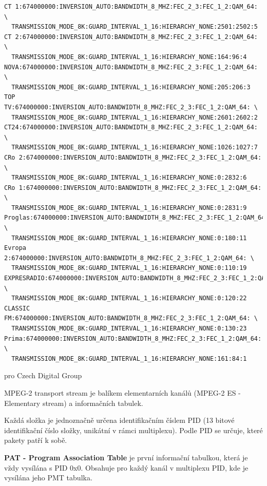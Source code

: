 \begin{small}
\begin{verbatim}
CT 1:674000000:INVERSION_AUTO:BANDWIDTH_8_MHZ:FEC_2_3:FEC_1_2:QAM_64: \
  TRANSMISSION_MODE_8K:GUARD_INTERVAL_1_16:HIERARCHY_NONE:2501:2502:5
CT 2:674000000:INVERSION_AUTO:BANDWIDTH_8_MHZ:FEC_2_3:FEC_1_2:QAM_64: \
  TRANSMISSION_MODE_8K:GUARD_INTERVAL_1_16:HIERARCHY_NONE:164:96:4
NOVA:674000000:INVERSION_AUTO:BANDWIDTH_8_MHZ:FEC_2_3:FEC_1_2:QAM_64: \
  TRANSMISSION_MODE_8K:GUARD_INTERVAL_1_16:HIERARCHY_NONE:205:206:3
TOP TV:674000000:INVERSION_AUTO:BANDWIDTH_8_MHZ:FEC_2_3:FEC_1_2:QAM_64: \
  TRANSMISSION_MODE_8K:GUARD_INTERVAL_1_16:HIERARCHY_NONE:2601:2602:2
CT24:674000000:INVERSION_AUTO:BANDWIDTH_8_MHZ:FEC_2_3:FEC_1_2:QAM_64: \
  TRANSMISSION_MODE_8K:GUARD_INTERVAL_1_16:HIERARCHY_NONE:1026:1027:7
CRo 2:674000000:INVERSION_AUTO:BANDWIDTH_8_MHZ:FEC_2_3:FEC_1_2:QAM_64: \
  TRANSMISSION_MODE_8K:GUARD_INTERVAL_1_16:HIERARCHY_NONE:0:2832:6
CRo 1:674000000:INVERSION_AUTO:BANDWIDTH_8_MHZ:FEC_2_3:FEC_1_2:QAM_64: \
  TRANSMISSION_MODE_8K:GUARD_INTERVAL_1_16:HIERARCHY_NONE:0:2831:9
Proglas:674000000:INVERSION_AUTO:BANDWIDTH_8_MHZ:FEC_2_3:FEC_1_2:QAM_64: \
  TRANSMISSION_MODE_8K:GUARD_INTERVAL_1_16:HIERARCHY_NONE:0:180:11
Evropa 2:674000000:INVERSION_AUTO:BANDWIDTH_8_MHZ:FEC_2_3:FEC_1_2:QAM_64: \
  TRANSMISSION_MODE_8K:GUARD_INTERVAL_1_16:HIERARCHY_NONE:0:110:19
EXPRESRADIO:674000000:INVERSION_AUTO:BANDWIDTH_8_MHZ:FEC_2_3:FEC_1_2:QAM_64: \
  TRANSMISSION_MODE_8K:GUARD_INTERVAL_1_16:HIERARCHY_NONE:0:120:22
CLASSIC FM:674000000:INVERSION_AUTO:BANDWIDTH_8_MHZ:FEC_2_3:FEC_1_2:QAM_64: \
  TRANSMISSION_MODE_8K:GUARD_INTERVAL_1_16:HIERARCHY_NONE:0:130:23
Prima:674000000:INVERSION_AUTO:BANDWIDTH_8_MHZ:FEC_2_3:FEC_1_2:QAM_64: \
  TRANSMISSION_MODE_8K:GUARD_INTERVAL_1_16:HIERARCHY_NONE:161:84:1
\end{verbatim}
\end{small}

\vspace{10pt}

pro Czech Digital Group 

\vspace{10pt}

MPEG-2 transport stream je balíkem elementarních kanálů (MPEG-2 ES - Elementary stream) a informačních tabulek.

Každá složka je jednoznačně určena identifikačním číslem PID (13 bitové identifikační číslo složky, unikátní v rámci multiplexu). Podle PID se určuje, které pakety patří k sobě.

\textbf{PAT - Program Association Table} je první informační tabulkou, která je vždy vysílána s PID 0x0. Obsahuje pro každý kanál v multiplexu PID, kde je vysílána jeho PMT tabulka.

